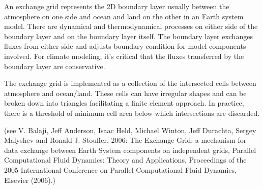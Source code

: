 
An exchange grid represents the 2D boundary layer usually between the
atmosphere on one side and ocean and land on the other in an Earth
system model. There are dynamical and thermodynamical processes on
either side of the boundary layer and on the boundary layer itself.
The boundary layer exchanges fluxes from either side and adjusts
boundary condition for model components involved. For climate modeling,
it's critical that the fluxes transferred by the boundary layer are
conservative.

The exchange grid is implemented as a collection of the intersected cells
between atmosphere and ocean/land. These cells can have irregular shapes
and can be broken down into triangles facilitating a finite element
approach. In practice, there is a threshold of minimum cell area below
which intersections are discarded.

(see V. Balaji, Jeff Anderson, Isaac Held, Michael Winton, Jeff Durachta,
Sergey Malyshev and Ronald J. Stouffer, 2006:  The Exchange Grid: a
mechanism for data exchange between Earth System components on independent
grids, Parallel Computational Fluid Dynamics: Theory and Applications,
Proceedings of the 2005 International Conference on Parallel Computational
Fluid Dynamics, Elsevier (2006).) 
